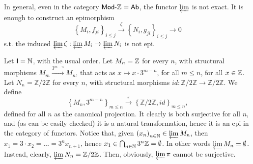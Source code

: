 \begin{ex}
	In general, even in the category $\mathsf{Mod}\text{-}\mathbb{Z} = \mathsf{Ab}$, the functor $\varprojlim$ is not exact.
	It is enough to construct an epimorphism
	\begin{equation}
		\left\{ M_i, f_{ji} \right\}_{i \leq j} \xrightarrow{\zeta} \left\{ N_i, g_{ji} \right\}_{i \leq j} \to 0 
	\end{equation} 
	s.t. the induced $\varprojlim \zeta: \varprojlim M_i \to \varprojlim N_i$  is not epi.

	Let $\mathsf{I} = \mathbb{N}$, with the usual order.
	Let $M_n = \mathbb{Z}$ for every $n$, with structural morphisms $M_m \xrightarrow{3^{m-n}} M_n$, 
	that acts as $x \mapsto x \cdot 3^{m-n}$, for all $m \leq n$, for all $x \in \mathbb{Z}$.
	Let $N_n = \mathbb{Z}/2\mathbb{Z}$ for every $n$, with structural morphisms $id: \mathbb{Z}/2\mathbb{Z} \to \mathbb{Z}/2\mathbb{Z}$.
	We define
	\begin{equation}
	\left\{ M_n, 3^{m-n} \right\}_{ m \leq n} \xrightarrow{\pi} \left\{ \mathbb{Z}/2\mathbb{Z}, id \right\}_{ m \leq n}
	,\end{equation} 
	defined for all $n$ as the canonical projection.
	It clearly is both surjective for all $n$, and (as can be easily checked) it is a natural transformation, hence it is an epi in the category of functors.
	Notice that, given $\left( x_n \right)_{n \in \mathbb{N}} \in \varprojlim M_n$, then $x_1 = 3 \cdot x_2 = \ldots = 3^n x_{n+1}$,
	hence $x_1 \in \bigcap_{n \in \mathbb{N}} 3^n \mathbb{Z} = \emptyset$.
	In other words $\varprojlim M_n = \emptyset$.
	Instead, clearly, $\varprojlim N_n = \mathbb{Z}/2\mathbb{Z}$.
	Then, obviously, $\varprojlim \pi$ cannot be surjective.
\end{ex} 

